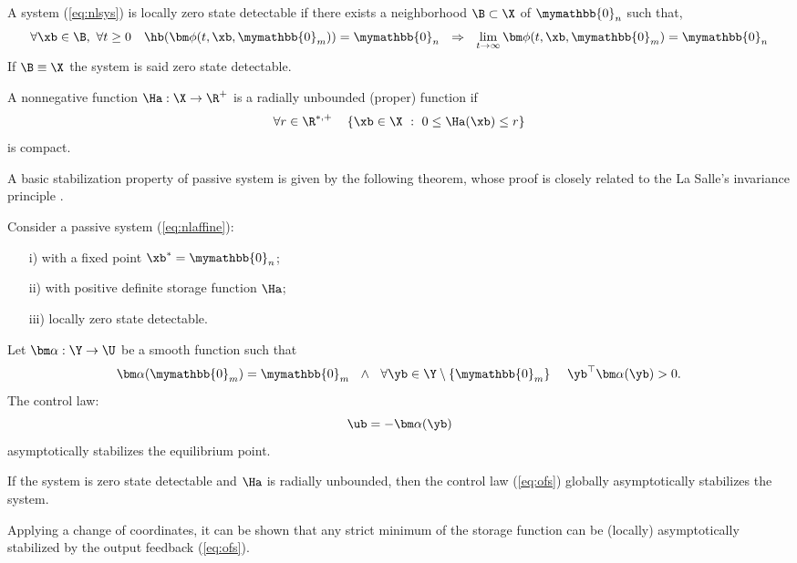\begin{defn}[Detectability]
	A system (\ref{eq:nlsys}) is locally zero state detectable if there exists a neighborhood $\B\subset\X$ of $\mymathbb{0}_n$ such that,
	\begin{equation}
	    \forall \xb\in \B,~\forall t\geq 0 \quad \hb(\bm\phi(t,\xb,\mymathbb{0}_m))=\mymathbb{0}_n~~\Rightarrow~~ \lim\limits_{t\rightarrow\infty}\bm\phi(t,\xb,\mymathbb{0}_m)=\mymathbb{0}_n
    \end{equation}
	If $\B\equiv\X$ the system is said zero state detectable.
\end{defn}
%
%
\begin{defn}
	A nonnegative function $\Ha:\X\rightarrow\R^+$ is a radially unbounded (proper) function if
	\begin{equation}
	\forall r\in\R^{*,+}\quad  \left\{\xb\in\X~:~0\leq \Ha(\xb)\leq r \right\}
	\end{equation}
	is compact.
\end{defn}
%
A basic stabilization property of passive system is given by the following theorem, whose proof is closely related to the La Salle's invariance principle \citep{lasalle1960some}. 
%
\begin{thm}
	Consider a passive system (\ref{eq:nlaffine}):
	\begin{itemize}
	    \item[i)] with a fixed point $\xb^*=\mymathbb{0}_n$;
	    \item[ii)] with positive definite storage function $\Ha$;
	    \item[iii)] locally zero state detectable.
	\end{itemize}
	Let $\bm\alpha:\Y\rightarrow\U$ be a smooth function such that 
	\begin{equation}
	    \bm\alpha(\mymathbb{0}_m)=\mymathbb{0}_m~~\land~~ \forall \yb\in\Y\setminus\{\mymathbb{0}_m\}~~~~\yb^\top\bm\alpha(\yb)>0.
	\end{equation}
	The control law:
	\begin{equation}\label{eq:ofs}
	\ub=-\bm\alpha(\yb)
	\end{equation}
	asymptotically stabilizes the equilibrium point.
\end{thm}
%
\begin{cor}
    If the system is zero state detectable and $\Ha$ is radially unbounded, then the control law (\ref{eq:ofs}) globally asymptotically stabilizes the system.
\end{cor}
%
Applying a change of coordinates, it can be shown that any strict minimum of the storage function can be (locally) asymptotically stabilized by the output feedback (\ref{eq:ofs}).
%
\newline


